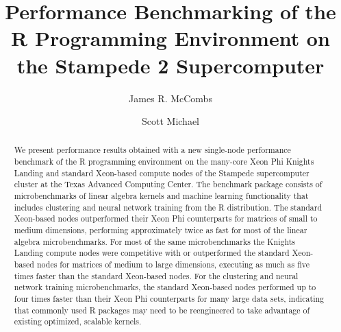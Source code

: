 \documentclass[sigconf]{acmart}
\begin{document}
\title{Performance Benchmarking of the R Programming Environment on the Stampede 2 Supercomputer}


\author{James R. McCombs}

\author{Scott Michael}

\renewcommand{\shortauthors}{J.R. McCombs et al.}


\begin{abstract}
We present performance results obtained with a new single-node performance
  benchmark of the R programming environment on the many-core Xeon Phi Knights
  Landing and standard Xeon-based compute nodes of the Stampede supercomputer
  cluster at the Texas Advanced Computing Center.
The benchmark package consists of microbenchmarks of linear algebra
  kernels and machine learning functionality that includes clustering and neural
  network training from the R distribution.
The standard Xeon-based nodes outperformed their Xeon Phi counterparts for
  matrices of small to medium dimensions, performing approximately twice as fast for
  most of the linear algebra microbenchmarks.
For most of the same microbenchmarks the Knights Landing compute nodes were
  competitive with or outperformed the standard Xeon-based nodes for matrices of
  medium to large dimensions, executing as much as five times faster than the
  standard Xeon-based nodes.
For the clustering and neural network training microbenchmarks, the standard
  Xeon-based nodes performed up to four times faster than their Xeon Phi
  counterparts for many large data sets, indicating that commonly used R
  packages may need to be reengineered to take advantage of existing optimized,
  scalable kernels.
\end{abstract}
\end{document}

